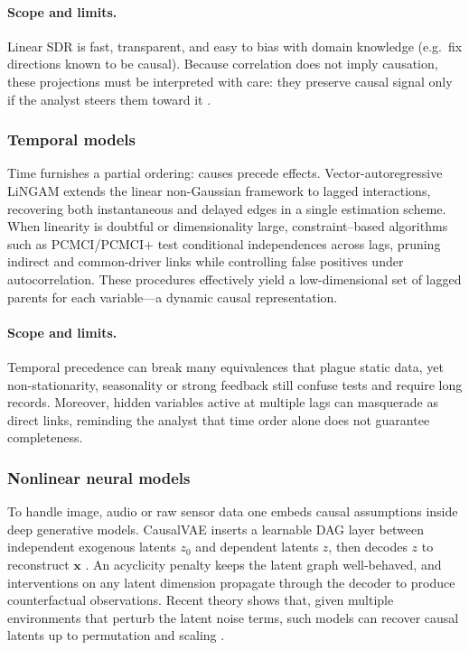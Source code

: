 \documentclass[14pt]{extarticle}
\begin{document}
	\paragraph{Scope and limits.}
	Linear SDR is fast, transparent, and easy to bias with domain knowledge (e.g.\ fix directions known to be causal).  
	Because correlation does not imply causation, these projections must be interpreted with care: they preserve causal signal only if the analyst steers them toward it \citep{Nabi2022}.
	
	\subsubsection*{Temporal models}
	
	Time furnishes a partial ordering: causes precede effects.  
	Vector-autoregressive LiNGAM extends the linear non-Gaussian framework to lagged interactions, recovering both instantaneous and delayed edges in a single estimation scheme.  
	When linearity is doubtful or dimensionality large, constraint–based algorithms such as PCMCI/PCMCI$+$ \citep{Runge2019} test conditional independences across lags, pruning indirect and common-driver links while controlling false positives under autocorrelation.  
	These procedures effectively yield a low-dimensional set of lagged parents for each variable—a dynamic causal representation.
	
	\paragraph{Scope and limits.}
	Temporal precedence can break many equivalences that plague static data, yet non-stationarity, seasonality or strong feedback still confuse tests and require long records.  
	Moreover, hidden variables active at multiple lags can masquerade as direct links, reminding the analyst that time order alone does not guarantee completeness.
	
	\subsubsection*{Nonlinear neural models}
	
	To handle image, audio or raw sensor data one embeds causal assumptions inside deep generative models.  
	CausalVAE inserts a learnable DAG layer between independent exogenous latents $z_0$ and dependent latents $z$, then decodes $z$ to reconstruct $\mathbf{x}$ \citep{Yang2021}.  
	An acyclicity penalty keeps the latent graph well-behaved, and interventions on any latent dimension propagate through the decoder to produce counterfactual observations.  
	Recent theory shows that, given multiple environments that perturb the latent noise terms, such models can recover causal latents up to permutation and scaling \citep{Scholkopf2021}.
	
\end{document}
